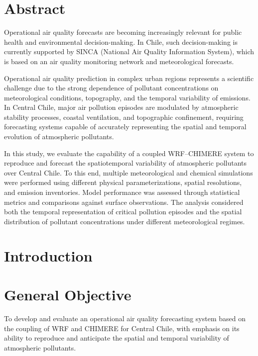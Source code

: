 \documentclass[
]{article}
\author{}
\date{}
\begin{document}
\section{\texorpdfstring{\textbf{Abstract}}{Abstract}}\label{abstract}

Operational air quality forecasts are becoming increasingly relevant for
public health and environmental decision-making. In Chile, such
decision-making is currently supported by SINCA (National Air Quality
Information System), which is based on an air quality monitoring network
and meteorological forecasts.

Operational air quality prediction in complex urban regions represents a
scientific challenge due to the strong dependence of pollutant
concentrations on meteorological conditions, topography, and the
temporal variability of emissions. In Central Chile, major air pollution
episodes are modulated by atmospheric stability processes, coastal
ventilation, and topographic confinement, requiring forecasting systems
capable of accurately representing the spatial and temporal evolution of
atmospheric pollutants.

In this study, we evaluate the capability of a coupled WRF--CHIMERE
system to reproduce and forecast the spatiotemporal variability of
atmospheric pollutants over Central Chile. To this end, multiple
meteorological and chemical simulations were performed using different
physical parameterizations, spatial resolutions, and emission
inventories. Model performance was assessed through statistical metrics
and comparisons against surface observations. The analysis considered
both the temporal representation of critical pollution episodes and the
spatial distribution of pollutant concentrations under different
meteorological regimes.

\section{\texorpdfstring{\textbf{Introduction}}{Introduction}}\label{introduction}

\section{\texorpdfstring{\textbf{General
Objective}}{General Objective}}\label{general-objective}

To develop and evaluate an operational air quality forecasting system
based on the coupling of WRF and CHIMERE for Central Chile, with
emphasis on its ability to reproduce and anticipate the spatial and
temporal variability of atmospheric pollutants.
\end{document}
